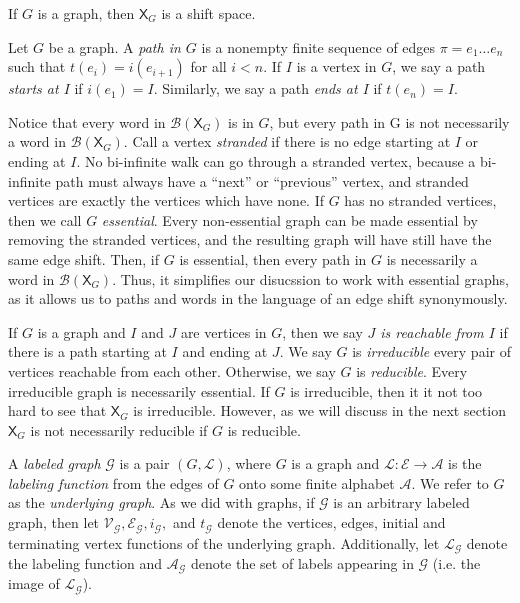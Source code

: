 \documentclass[hidelinks]{report}
\newcommand{\Ac}{\mathcal{A}}  %
\newcommand{\Lc}{\mathcal{L}}  %
\newcommand{\Gc}{\mathcal{G}}  %
\newcommand{\Vc}{\mathcal{V}}
\newcommand{\Ec}{\mathcal{E}}
\newcommand{\Bc}{\mathcal{B}}
\newcommand{\shift}[1]{\mathsf{X}_{#1}}
\newcommand{\term}[1]{\textit{#1}}
\theoremstyle{definition}
\begin{document}
\begin{theorem}[name=\cite{lind1995introduction}]
    If \(G\) is a graph, then \(\shift{G}\) is a shift space.
\end{theorem}

Let \(G\) be a graph. A \term{path in \(G\)} is a nonempty finite sequence of edges \(\pi = e_1 \dots e_n\) such that \(t(e_i) = i(e_{i+1})\) for all \(i < n\).
If \(I\) is a vertex in \(G\), we say a path \term{starts at \(I\)} if \(i(e_1) = I\). Similarly, 
we say a path \term{ends at \(I\)} if \(t(e_n) = I\).

Notice that every word in \(\Bc(\shift{G})\) is in \(G\), but every path in G is 
not necessarily a word in \(\Bc(\shift{G})\). Call a vertex \term{stranded} if 
there is no edge starting at \(I\) or  ending at \(I\). No bi-infinite walk can go 
through a stranded vertex, because a bi-infinite path must always have a ``next''
or ``previous'' vertex, and stranded vertices are exactly the vertices which have none.
If \(G\) has no stranded vertices, then we call \(G\) \term{essential}. Every 
non-essential graph can be made essential by removing the stranded vertices, and 
the resulting graph will have still have the same edge shift. Then, if \(G\) 
is essential, then every path in \(G\) is necessarily a word in \(\Bc(\shift{G})\). 
Thus, it simplifies our disucssion to work with essential graphs, as 
it allows us to paths and words in the language of an edge shift synonymously. 

If \(G\) is a graph and \(I\) and \(J\)
are vertices in \(G\), then we say \term{\(J\) is reachable from \(I\)}
if there is a path starting at \(I\) and ending at \(J\). We say \(G\) is \term{irreducible}
every pair of vertices reachable from each other. Otherwise, we say \(G\) is \term{reducible}. 
Every irreducible graph is necessarily essential. If \(G\) is irreducible, then 
it it not too hard to see that \(\shift{G}\) is irreducible. However, 
as we will discuss in the next section \(\shift{G}\) is not necessarily reducible 
if \(G\) is reducible.

\begin{definition}
    A \term{labeled graph} \(\Gc\) is a pair \((G, \Lc)\), where \(G\) is a graph and \(\Lc : \Ec \to \Ac\) is the 
    \term{labeling function} from the edges of \(G\) onto some finite alphabet \(\Ac\). We 
    refer to \(G\) as the \term{underlying graph}.
    As we did with graphs, if \(\Gc\) is an arbitrary labeled graph, then 
    let \(\Vc_\Gc, \Ec_\Gc, i_\Gc,\) and \(t_\Gc\) denote the vertices, edges, 
    initial and terminating vertex functions of the underlying graph. Additionally,
    let \(\Lc_\Gc\) denote the labeling function and \(\Ac_\Gc\) denote the set 
    of labels appearing in \(\Gc\) (i.e. the image of \(\Lc_\Gc\)).
\end{definition}
\end{document}
